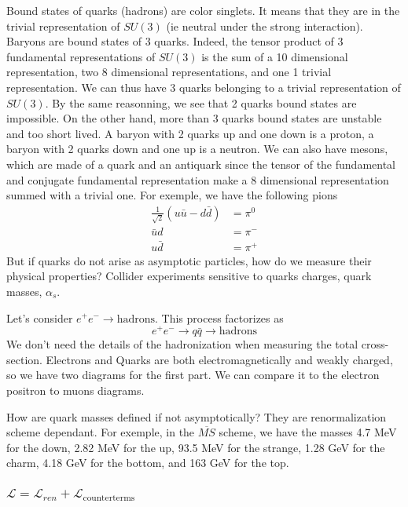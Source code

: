 \documentclass[a4paper]{book}
\theoremstyle{definition}
\theoremstyle{remark}
\begin{document}
Bound states of quarks (hadrons) are color singlets. It means that they are in the trivial representation of $SU(3)$ (ie neutral under the strong interaction). Baryons are bound states of 3 quarks. Indeed, the tensor product of 3 fundamental representations of $SU(3)$ is the sum of a 10 dimensional representation, two 8 dimensional representations, and one 1 trivial representation. We can thus have 3 quarks belonging to a trivial representation of $SU(3)$. By the same reasonning, we see that 2 quarks bound states are impossible. On the other hand, more than 3 quarks bound states are unstable and too short lived. A baryon with 2 quarks up and one down is a proton, a baryon with 2 quarks down and one up is a neutron. We can also have mesons, which are made of a quark and an antiquark since the tensor of the fundamental and conjugate fundamental representation make a 8 dimensional representation summed with a trivial one. For exemple, we have the following pions 
\begin{equation}
    \begin{aligned}
        \frac{1}{\sqrt{2}}(u\bar{u} - d\bar{d}) &= \pi^0 \\
        \bar{u}d &= \pi^- \\ 
        u\bar{d} &= \pi^+
    \end{aligned}
\end{equation}
But if quarks do not arise as asymptotic particles, how do we measure their physical properties? Collider experiments sensitive to quarks charges, quark masses, $\alpha_s$. \par \medskip 
Let's consider $e^+ e^- \rightarrow \text{hadrons}$. This process factorizes as 
\begin{equation}
    e^+ e^- \rightarrow q\bar{q} \rightarrow \text{hadrons}
\end{equation}
We don't need the details of the hadronization when measuring the total cross-section. Electrons and Quarks are both electromagnetically and weakly charged, so we have two diagrams for the first part. We can compare it to the electron positron to muons diagrams. \par \medskip 

How are quark masses defined if not asymptotically? They are renormalization scheme dependant. For exemple, in the $\overline{MS}$ scheme, we have the masses 4.7 MeV for the down, 2.82 MeV for the up, 93.5 MeV for the strange, 1.28 GeV for the charm, 4.18 GeV for the bottom, and 163 GeV for the top.  

\subsubsection{$\mathcal L = \mathcal L_{ren} + \mathcal L_{\text{counterterms}}$}
\end{document}
